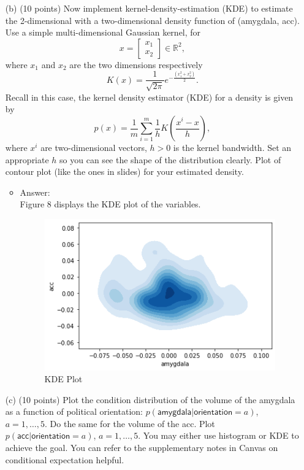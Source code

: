 \documentclass[twoside,10pt]{article}
\begin{document}
\begin{enumerate}
\begin{itemize}
\end{itemize}
 
 \item[(b)] (10 points) Now implement kernel-density-estimation (KDE) to estimate the 2-dimensional with a two-dimensional density function of (\textsf{amygdala}, \textsf{acc}). Use a simple multi-dimensional Gaussian kernel, for \[x = \begin{bmatrix}x_1\\x_2\end{bmatrix}\in \mathbb R^2,\] where $x_1$ and $x_2$ are the two dimensions respectively \[K(x) = \frac{1}{\sqrt {2\pi}} e^{-\frac{(x_1^2 + x_2^2)}{2}}.\] Recall in this case, the kernel density estimator (KDE) for a density is given by
 \[
 p(x) = \frac 1 m \sum_{i=1}^m \frac 1 h
 K\left(
 \frac{x^i - x}{h}
 \right),
 \]
 where $x^i$ are two-dimensional vectors, $h >0$ is the kernel bandwidth. Set an appropriate $h$ so you can see the shape of the distribution clearly. Plot of contour plot (like the ones in slides) for your estimated density. 
\begin{itemize}
\item Answer:\\
Figure 8 displays the KDE plot of the variables.
\begin{figure}[h!]
\begin{center}
\includegraphics[totalheight=3in]{Images/Q2b.png}
\end{center}
\caption{KDE Plot}
\end{figure}

\end{itemize} 
 
 \item[(c)] (10 points) Plot the condition distribution of the volume of the \textsf{amygdala} as a function of political \textsf{orientation}: $p(\textsf{amygdala}|\textsf{orientation}=a)$, $a = 1, \ldots, 5$. Do the same for the volume of the 
 \textsf{acc}. Plot $p(\textsf{acc}|\textsf{orientation}=a)$, $a = 1, \ldots, 5$. You may either use histogram or KDE to achieve the goal. You can refer to the supplementary notes in Canvas on conditional expectation helpful.
 \end{enumerate}
\end{document}
